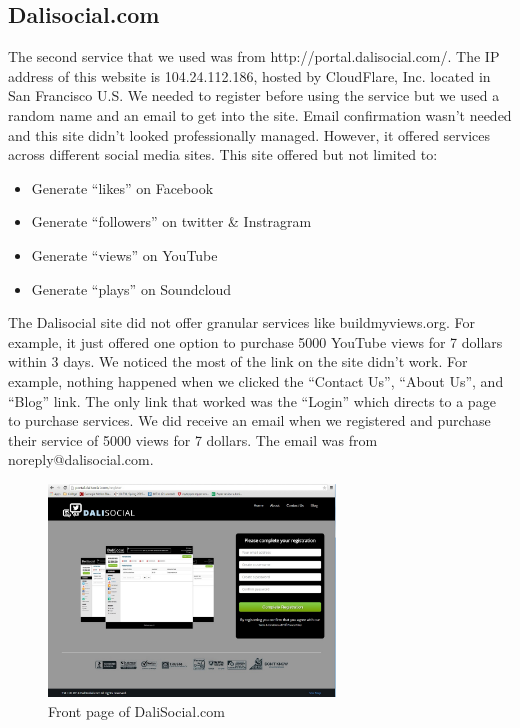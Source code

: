 \documentclass[conference]{IEEEtran}
\begin{document}
\subsection{Dalisocial.com}

The second service that we used was from http://portal.dalisocial.com/. The IP address of this website is 104.24.112.186, hosted by CloudFlare, Inc. located in San Francisco U.S. We needed to register before using the service but we used a random name and an email to get into the site. Email confirmation wasn’t needed and this site didn’t looked professionally managed. However, it offered services across different social media sites. This site offered but not limited to:

\begin{itemize}
  \item Generate ``likes'' on Facebook
  \item Generate ``followers'' on twitter \& Instragram
  \item Generate ``views'' on YouTube
  \item Generate ``plays'' on Soundcloud
\end{itemize}

The Dalisocial site did not offer granular services like buildmyviews.org. For example, it just offered one option to purchase 5000 YouTube views for 7 dollars within 3 days. We noticed the most of the link on the site didn’t work. For example, nothing happened when we clicked the ``Contact Us'', ``About Us'', and ``Blog'' link. The only link that worked was the ``Login'' which directs to a page to purchase services. We did receive an email when we registered and purchase their service of 5000 views for 7 dollars. The email was from noreply@dalisocial.com.

\begin{figure}
  \centering
  \includegraphics[width=3.0in]{fig2}
  \caption{Front page of DaliSocial.com}
\end{figure}
\end{document}
